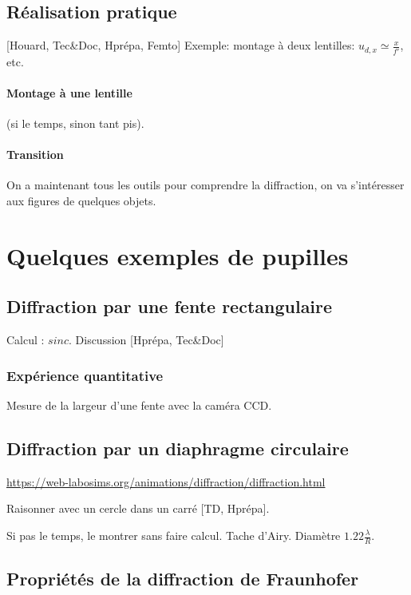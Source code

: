 \documentclass[11pt]{report}
\numberwithin{figure}{section}
\numberwithin{equation}{section}
\numberwithin{table}{section}
\newcommand{\1}{\boldsymbol{1}}
\begin{document}
\subsection{Réalisation pratique}

[Houard, Tec\&Doc, Hprépa, Femto] Exemple: montage à deux lentilles: $u_{d,x} \simeq \frac{x}{f'}$, etc.

\paragraph{Montage à une lentille} (si le temps, sinon tant pis).

\paragraph{Transition} On a maintenant tous les outils pour comprendre la diffraction, on va s’intéresser aux figures de quelques objets.


\section{Quelques exemples de pupilles}

\subsection{Diffraction par une fente rectangulaire}

Calcul : $sinc$. Discussion [Hprépa, Tec\&Doc]


\subsubsection{Expérience quantitative} Mesure de la largeur d'une fente avec la caméra CCD.

\subsection{Diffraction par un diaphragme circulaire}

\url{https://web-labosims.org/animations/diffraction/diffraction.html}

Raisonner avec un cercle dans un carré [TD, Hprépa]. 

Si pas le temps, le montrer sans faire calcul. 
Tache d'Airy. Diamètre $1.22 \frac{\lambda}{R}$.

\subsection{Propriétés de la diffraction de Fraunhofer}
\end{document}
